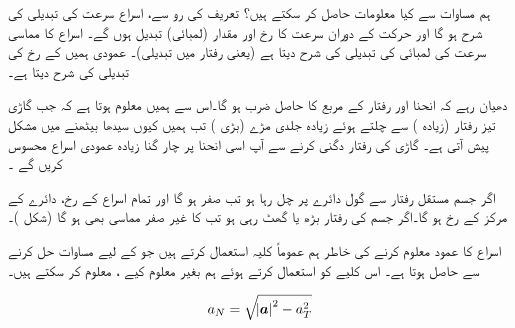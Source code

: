 ہم مساوات  سے کیا معلومات حاصل کر سکتے ہیں؟ تعریف کی رو سے،  اسراع  سرعت  کی  تبدیلی کی شرح ہو گا اور حرکت کے دوران سرعت کا رخ اور  مقدار (لمبائی)  تبدیل ہوں گے۔ اسراع کا مماسی    سرعت   کی لمبائی کی تبدیلی  کی شرح دیتا ہے (یعنی رفتار میں تبدیلی)۔ عمودی   ہمیں  کے رخ کی تبدیلی کی شرح دیتا ہے۔

دھیان رہے کہ    انحنا  اور  رفتار کے مربع  کا حاصل ضرب  ہو گا۔اس سے ہمیں معلوم ہوتا ہے کہ جب  گاڑی تیز رفتار (زیادہ ) سے چلتے ہوئے زیادہ جلدی  مڑے (بڑی )   تب ہمیں  کیوں  سیدھا  بیٹھنے میں مشکل پیش آتی ہے۔ گاڑی کی رفتار دگنی کرنے سے آپ اسی انحنا پر   چار گنا  زیادہ عمودی اسراع محسوس کریں گے ۔

اگر  جسم مستقل رفتار سے گول دائرے پر  چل رہا ہو تب     صفر ہو گا اور تمام اسراع  کے رخ، دائرے کے مرکز کے رخ ہو گا۔اگر  جسم کی رفتار بڑھ یا گھٹ رہی ہو تب  کا غیر صفر مماسی  بھی  ہو گا (شکل )۔

اسراع کا عمود   معلوم کرنے کی خاطر ہم عموماً کلیہ  استعمال کرتے ہیں جو  کے لیے    مساوات  حل کرنے سے حاصل ہوتا ہے۔ اس کلیے کو استعمال کرتے ہوئے  ہم بغیر  معلوم کیے ،  معلوم کر سکتے ہیں۔

\begin{align}\label{مساوات_سمتی_تفاعل_اسراع_پ}
a_N=\sqrt{\abs{{{\boldsymbol{a}}}}^2-a_T^2}
\end{align}

